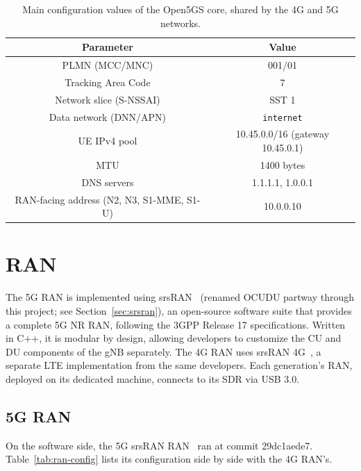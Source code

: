 \begin{table}[htbp]
    \centering
    \begin{tabular}{|c|c|}
        \hline
        \textbf{Parameter} & \textbf{Value} \\
        \hline
        \gls{PLMN} (MCC/MNC) & 001/01 \\
        \hline
        Tracking Area Code & 7 \\
        \hline
        Network slice (S-NSSAI) & SST 1 \\
        \hline
        Data network (DNN/APN) & \texttt{internet} \\
        \hline
        \gls{UE} IPv4 pool & 10.45.0.0/16 (gateway 10.45.0.1) \\
        \hline
        MTU & 1400 bytes \\
        \hline
        DNS servers & 1.1.1.1, 1.0.0.1 \\
        \hline
        \gls{RAN}-facing address (N2, N3, S1-MME, S1-U) & 10.0.0.10 \\
        \hline
    \end{tabular}
    \caption[Main configuration values of the Open5GS core.]{Main configuration values of the Open5GS core, shared by the 4G and 5G networks.}
    \label{tab:core-config}
\end{table}

\section{\gls{RAN}}
\label{sec:ran}

The 5G \gls{RAN} is implemented using srsRAN~\cite{ocudu_project} (renamed OCUDU partway through this project; see Section~\ref{sec:srsran}), an open-source software suite that provides a complete 5G \gls{NR} \gls{RAN}, following the \gls{3GPP} Release 17 specifications. Written in C++, it is modular by design, allowing developers to customize the \gls{CU} and \gls{DU} components of the \gls{gNB} separately. The 4G \gls{RAN} uses srsRAN 4G~\cite{srsran_4g_repo}, a separate \gls{LTE} implementation from the same developers. Each generation's \gls{RAN}, deployed on its dedicated machine, connects to its \gls{SDR} via USB 3.0.

\subsection{5G RAN}
\label{sec:ran-5g}

On the software side, the 5G srsRAN \gls{RAN}~\cite{ocudu_project} ran at commit 29dc1aede7. Table~\ref{tab:ran-config} lists its configuration side by side with the 4G \gls{RAN}'s.

